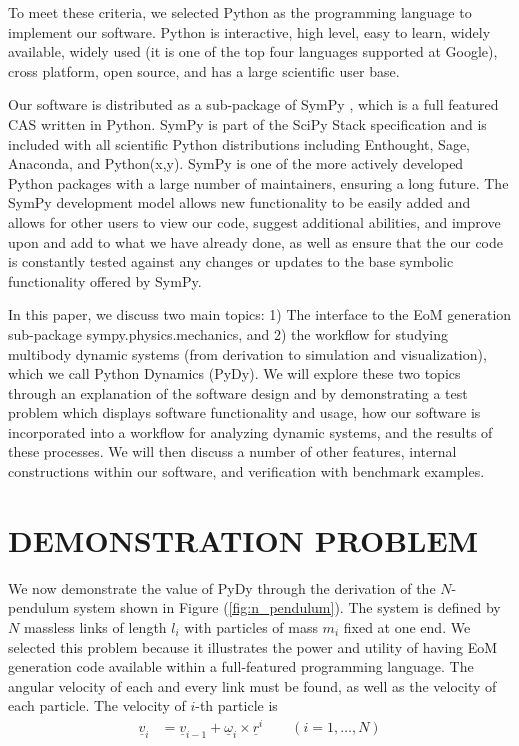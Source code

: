 \documentclass[twocolumn,10pt]{asme2e}
\begin{document}
To meet these criteria, we selected Python as the programming language to
implement our software. Python is interactive, high level, easy to learn,
widely available, widely used (it is one of the top four languages supported at
Google), cross platform, open source, and has a large scientific user base.

Our software is distributed as a sub-package of SymPy \cite{sympy2012}, which
is a full featured CAS written in Python. SymPy is part of the SciPy Stack
\cite{SciPyStackGithub} specification and is included with all scientific
Python distributions including Enthought, Sage, Anaconda, and Python(x,y).
SymPy is one of the more actively developed Python packages with a large number
of maintainers, ensuring a long future. The SymPy development model allows new
functionality to be easily added and allows for other users to view our code,
suggest additional abilities, and improve upon and add to what we have already
done, as well as ensure that the our code is constantly tested against any
changes or updates to the base symbolic functionality offered by SymPy.

In this paper, we discuss two main topics: 1) The interface to the EoM
generation sub-package sympy.physics.mechanics, and 2) the workflow for
studying multibody dynamic systems (from derivation to simulation and
visualization), which we call Python Dynamics (PyDy). We will explore these two
topics through an explanation of the software design and by demonstrating a
test problem which displays software functionality and usage, how our software
is incorporated into a workflow for analyzing dynamic systems, and the results
of these processes. We will then discuss a number of other features, internal
constructions within our software, and verification with benchmark examples.

\section*{DEMONSTRATION PROBLEM}
We now demonstrate the value of PyDy through the derivation of the $N$-pendulum
system shown in Figure (\ref{fig:n_pendulum}).  The system is defined by $N$
massless links of length $l_i$ with particles of mass $m_i$ fixed at one end.
We selected this problem because it illustrates the power and utility of having
EoM generation code available within a full-featured programming language. The
angular velocity of each and every link must be found, as well as the velocity
of each particle. The velocity of $i$-th particle is
\begin{align*}
  \underline{v}_i &= \underline{v}_{i-1} + \underline{\omega}_i \times
  \underline{r}^i \qquad (i = 1,\dots,N)
\end{align*}
\end{document}
